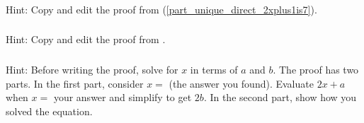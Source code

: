 \subsubsection*{ \answers}
Hint: Copy and edit the proof from  (\ref{part_unique_direct_2xplus1is7}).

\subsubsection*{ \answers}
Hint: Copy and edit the proof from .

\subsubsection*{ \answers}
Hint: Before writing the proof, solve for $x$ in terms of $a$ and $b$.  The proof has two parts.  In the first part, consider $x = $ (the answer you found).  Evaluate $2x + a$ when $x=$ your answer and simplify to get $2b$.  In the second part, show how you solved the equation.



